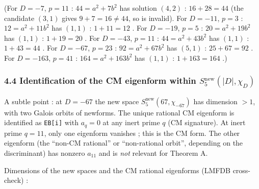 \documentclass[
  11pt,
  a4paper,
]{amsart}
\begin{document}
(For \(D = -7\), \(p = 11\) : \(44 = a^2 + 7 b^2\) has solution \((4, 2)\) : \(16 + 28 = 44\) (the candidate \((3, 1)\) gives \(9 + 7 = 16 \ne 44\), so is invalid). For \(D = -11\), \(p = 3\) : \(12 = a^2 + 11 b^2\) has \((1, 1)\) : \(1 + 11 = 12\) . For \(D = -19\), \(p = 5\) : \(20 = a^2 + 19 b^2\) has \((1, 1)\) : \(1 + 19 = 20\) . For \(D = -43\), \(p = 11\) : \(44 = a^2 + 43 b^2\) has \((1, 1)\) : \(1 + 43 = 44\) . For \(D = -67\), \(p = 23\) : \(92 = a^2 + 67 b^2\) has \((5, 1)\) : \(25 + 67 = 92\) . For \(D = -163\), \(p = 41\) : \(164 = a^2 + 163 b^2\) has \((1, 1)\) : \(1 + 163 = 164\) .)

\hypertarget{identification-of-the-cm-eigenform-within-s_5mathrmnewd-chi_d}{%
\subsubsection{\texorpdfstring{4.4 Identification of the CM eigenform within \(S_5^{\mathrm{new}}(|D|, \chi_D)\)}{4.4 Identification of the CM eigenform within S\_5\^{}\{\textbackslash mathrm\{new\}\}(\textbar D\textbar, \textbackslash chi\_D)}}\label{identification-of-the-cm-eigenform-within-s_5mathrmnewd-chi_d}}

A subtle point : at \(D = -67\) the new space \(S_5^{\mathrm{new}}(67, \chi_{-67})\) has dimension \(> 1\), with two Galois orbits of newforms. The unique rational CM eigenform is identified as \texttt{EB{[}i{]}} with \(a_q = 0\) at any inert prime \(q\) (CM signature). At inert prime \(q = 11\), only one eigenform vanishes ; this is the CM form. The other eigenform (the ``non-CM rational'' or ``non-rational orbit'', depending on the discriminant) has nonzero \(a_{11}\) and is \emph{not} relevant for Theorem A.

Dimensions of the new spaces and the CM rational eigenforms (LMFDB cross-check) :
\end{document}
